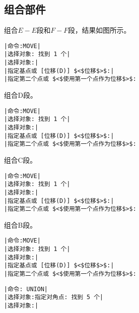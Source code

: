 \subsection{组合部件}
\begin{procedure}
\item 组合$E-E$段和$F-F$段，结果如图所示。
\begin{lstlisting}
|命令:MOVE|
|选择对象: 找到 1 个|
|选择对象:|
|指定基点或 [位移(D)] $<$位移$>$:|
|指定第二个点或 $<$使用第一个点作为位移$>$:
\end{lstlisting}
\begin{figure}[htbp]
\centering
\begin{floatrow}[3]
\end{floatrow}
\end{figure}
\item 组合D段。
\begin{lstlisting}
|命令:MOVE|
|选择对象: 找到 1 个|
|选择对象:|
|指定基点或 [位移(D)] $<$位移$>$:|
|指定第二个点或 $<$使用第一个点作为位移$>$:
\end{lstlisting}
\item 组合C段。
\begin{lstlisting}
|命令:MOVE|
|选择对象: 找到 1 个|
|选择对象:|
|指定基点或 [位移(D)] $<$位移$>$:|
|指定第二个点或 $<$使用第一个点作为位移$>$:
\end{lstlisting}
\newpage
\item 组合B段。
\begin{lstlisting}
|命令:MOVE|
|选择对象: 找到 1 个|
|选择对象:|
|指定基点或 [位移(D)] $<$位移$>$:|
|指定第二个点或 $<$使用第一个点作为位移$>$:
\end{lstlisting}
\begin{figure}[htbp]
\centering
\begin{floatrow}[3]
\end{floatrow}
\end{figure}
\begin{lstlisting}
|命令: UNION|
|选择对象:指定对角点: 找到 5 个|
|选择对象:|
\end{lstlisting}
\end{procedure}
\endinput
